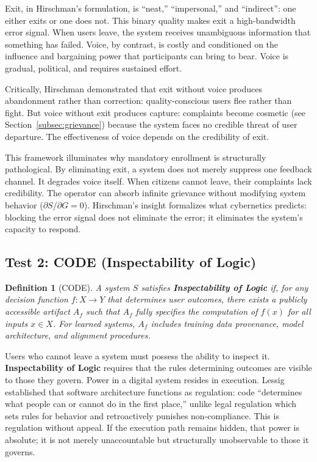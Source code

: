 \documentclass{article}
\newtheorem{definition}{Definition}
\begin{document}
Exit, in Hirschman's formulation, is ``neat,'' ``impersonal,'' and ``indirect'': one either exits or one does not. This binary quality makes exit a high-bandwidth error signal. When users leave, the system receives unambiguous information that something has failed. Voice, by contrast, is costly and conditioned on the influence and bargaining power that participants can bring to bear. Voice is gradual, political, and requires sustained effort.

Critically, Hirschman demonstrated that exit without voice produces abandonment rather than correction: quality-conscious users flee rather than fight. But voice without exit produces capture: complaints become cosmetic (see Section~\ref{subsec:grievance}) because the system faces no credible threat of user departure. The effectiveness of voice depends on the credibility of exit.

This framework illuminates why mandatory enrollment is structurally pathological. By eliminating exit, a system does not merely suppress one feedback channel. It degrades voice itself. When citizens cannot leave, their complaints lack credibility. The operator can absorb infinite grievance without modifying system behavior ($\partial S / \partial G = 0$). Hirschman's insight formalizes what cybernetics predicts: blocking the error signal does not eliminate the error; it eliminates the system's capacity to respond.

\subsection{Test 2: CODE (Inspectability of Logic)}

\begin{definition}[CODE]
\label{def:code}
A system $S$ satisfies \textbf{Inspectability of Logic} if, for any decision function $f: X \to Y$ that determines user outcomes, there exists a publicly accessible artifact $A_f$ such that $A_f$ fully specifies the computation of $f(x)$ for all inputs $x \in X$. For learned systems, $A_f$ includes training data provenance, model architecture, and alignment procedures.
\end{definition}

Users who cannot leave a system must possess the ability to inspect it. \textbf{Inspectability of Logic} requires that the rules determining outcomes are visible to those they govern. Power in a digital system resides in execution. Lessig \citep{lessig2006} established that software architecture functions as regulation: code ``determines what people can or cannot do in the first place,'' unlike legal regulation which sets rules for behavior and retroactively punishes non-compliance. This is regulation without appeal. If the execution path remains hidden, that power is absolute; it is not merely unaccountable but structurally unobservable to those it governs.
\end{document}
